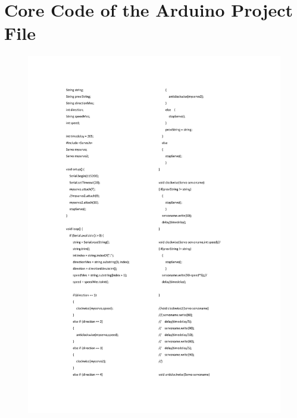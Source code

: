 \section{Core Code of the Arduino Project File}
\begin{figure}[h]
\centering
\includegraphics[width=1\textwidth,height=0.7\textheight]{A_thesis/appendix/code_arduino-1.png}
\end{figure}
\newpage

